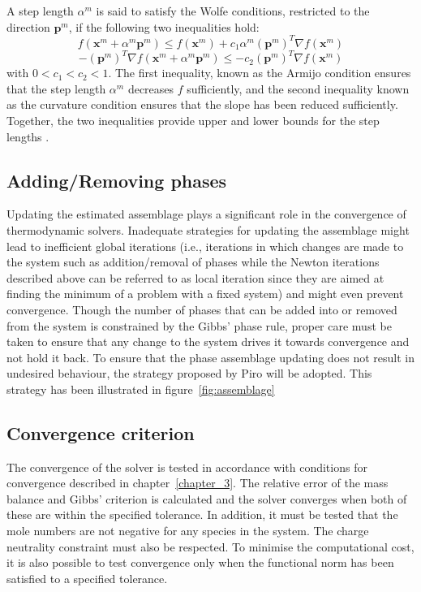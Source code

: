 	A step length $\alpha^m$ is said to satisfy the Wolfe conditions, restricted to the direction $\mathbf{p}^m$, if the following two inequalities hold:
	\begin{equation}
		f\left(\mathbf{x}^m + \alpha^m \mathbf{p}^m\right) \leq f\left(\mathbf{x}^m \right) + c_1 \alpha^m \left(\mathbf{p}^m\right)^T \nabla f\left(\mathbf{x}^m \right)
	\end{equation}
	\begin{equation}
		- \left(\mathbf{p}^m\right)^T \nabla f\left(\mathbf{x}^m + \alpha^m \mathbf{p}^m\right) \leq - c_2 \left(\mathbf{p}^m\right)^T \nabla f\left(\mathbf{x}^m \right)
	\end{equation}
	with $0 < c_1 < c_2 < 1$. The first inequality, known as the Armijo condition ensures that the step length $\alpha^m$ decreases $f$ sufficiently, and the second inequality known as the curvature condition ensures that the slope has been reduced sufficiently. Together, the two inequalities provide upper and lower bounds for the step lengths \cite{Nocedal06}. 
		
	\subsection{Adding/Removing phases}
		Updating the estimated assemblage plays a significant role in the convergence of thermodynamic solvers. Inadequate strategies for updating the assemblage might lead to inefficient global iterations (i.e., iterations in which changes are made to the system such as addition/removal of phases while the Newton iterations described above can be referred to as local iteration since they are aimed at finding the minimum of a problem with a fixed system) and might even prevent convergence. Though the number of phases that can be added into or removed from the system is constrained by the Gibbs' phase rule, proper care must be taken to ensure that any change to the system drives it towards convergence and not hold it back. To ensure that the phase assemblage updating does not result in undesired behaviour, the strategy proposed by Piro \cite{Piro17} will be adopted. This strategy has been illustrated in figure~\ref{fig:assemblage}
		
	\subsection{Convergence criterion}
	The convergence of the solver is tested in accordance with conditions for convergence described in chapter~\ref{chapter_3}. The relative error of the mass balance and Gibbs' criterion is calculated  and the solver converges when both of these are within the specified tolerance. In addition, it must be tested that the mole numbers are not negative for any species in the system. The charge neutrality constraint must also be respected.  To minimise the computational cost, it is also possible to test convergence only when the functional norm has been satisfied to a specified tolerance.
	
